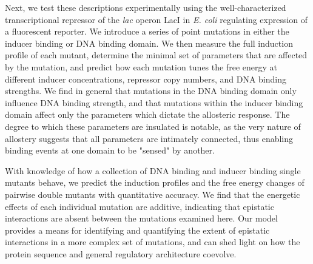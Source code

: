 Next, we test these descriptions experimentally using the well-characterized
transcriptional repressor of the \textit{lac} operon LacI in \textit{E.
coli} regulating expression of a fluorescent reporter. We introduce a series
of point mutations in either the inducer binding or DNA binding domain. We
then measure the full induction profile of each mutant, determine the minimal
set of parameters that are affected by the mutation, and predict
how each mutation tunes the free energy at different inducer concentrations,
repressor copy numbers, and DNA binding strengths.
We find in general that mutations in the DNA binding domain only influence
DNA binding strength, and that mutations within the inducer binding domain
affect only the parameters which dictate the allosteric response. The
degree to which these parameters are insulated is notable, as the very nature
of allostery suggests that all parameters are intimately connected, thus enabling
binding events at one domain to be "sensed" by another. 

With knowledge of how a collection of DNA binding and inducer binding single mutants
behave, we predict the induction profiles and the free energy
changes of pairwise double mutants with quantitative accuracy. We find that
the energetic effects of each individual mutation are additive, indicating that
epistatic interactions are absent between the mutations examined here. Our model
provides a means for identifying and quantifying the extent of epistatic
interactions in a more complex set of mutations, and can shed light on how the
protein sequence and general regulatory architecture coevolve.